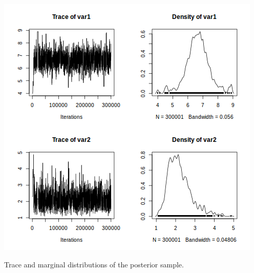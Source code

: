 \documentclass{beamer}
\begin{document}
\begin{frame}
  \begin{center}
    \includegraphics[scale=0.4]{posterior.png}

Trace and marginal distributions of the posterior sample. 
  \end{center}
\end{frame}
\end{document}
